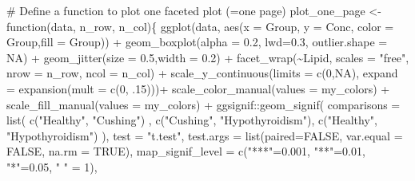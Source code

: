 \documentclass[
  letterpaper,
  DIV=11,
  numbers=noendperiod]{scrreprt}
\newenvironment{Shaded}{\begin{snugshade}}{\end{snugshade}}
\newcommand{\AttributeTok}[1]{\textcolor[rgb]{0.40,0.45,0.13}{#1}}
\newcommand{\CommentTok}[1]{\textcolor[rgb]{0.37,0.37,0.37}{#1}}
\newcommand{\ConstantTok}[1]{\textcolor[rgb]{0.56,0.35,0.01}{#1}}
\newcommand{\ControlFlowTok}[1]{\textcolor[rgb]{0.00,0.23,0.31}{#1}}
\newcommand{\DecValTok}[1]{\textcolor[rgb]{0.68,0.00,0.00}{#1}}
\newcommand{\FloatTok}[1]{\textcolor[rgb]{0.68,0.00,0.00}{#1}}
\newcommand{\FunctionTok}[1]{\textcolor[rgb]{0.28,0.35,0.67}{#1}}
\newcommand{\NormalTok}[1]{\textcolor[rgb]{0.00,0.23,0.31}{#1}}
\newcommand{\OtherTok}[1]{\textcolor[rgb]{0.00,0.23,0.31}{#1}}
\newcommand{\SpecialCharTok}[1]{\textcolor[rgb]{0.37,0.37,0.37}{#1}}
\newcommand{\StringTok}[1]{\textcolor[rgb]{0.13,0.47,0.30}{#1}}
\begin{document}
\begin{Shaded}
\begin{Highlighting}[]
\CommentTok{\# Define a function to plot one faceted plot (=one page)}
\NormalTok{plot\_one\_page }\OtherTok{\textless{}{-}} \ControlFlowTok{function}\NormalTok{(data, n\_row, n\_col)\{}
  \FunctionTok{ggplot}\NormalTok{(data, }\FunctionTok{aes}\NormalTok{(}\AttributeTok{x =}\NormalTok{ Group, }\AttributeTok{y =}\NormalTok{ Conc, }\AttributeTok{color =}\NormalTok{ Group,}\AttributeTok{fill =}\NormalTok{ Group)) }\SpecialCharTok{+} 
    \FunctionTok{geom\_boxplot}\NormalTok{(}\AttributeTok{alpha =} \FloatTok{0.2}\NormalTok{, }\AttributeTok{lwd=}\FloatTok{0.3}\NormalTok{, }\AttributeTok{outlier.shape =} \ConstantTok{NA}\NormalTok{) }\SpecialCharTok{+}
    \FunctionTok{geom\_jitter}\NormalTok{(}\AttributeTok{size =} \FloatTok{0.5}\NormalTok{,}\AttributeTok{width =} \FloatTok{0.2}\NormalTok{) }\SpecialCharTok{+}
    \FunctionTok{facet\_wrap}\NormalTok{(}\SpecialCharTok{\textasciitilde{}}\NormalTok{Lipid, }\AttributeTok{scales =} \StringTok{"free"}\NormalTok{, }\AttributeTok{nrow =}\NormalTok{ n\_row, }\AttributeTok{ncol =}\NormalTok{ n\_col) }\SpecialCharTok{+} 
    \FunctionTok{scale\_y\_continuous}\NormalTok{(}\AttributeTok{limits =} \FunctionTok{c}\NormalTok{(}\DecValTok{0}\NormalTok{,}\ConstantTok{NA}\NormalTok{), }\AttributeTok{expand =} \FunctionTok{expansion}\NormalTok{(}\AttributeTok{mult =} \FunctionTok{c}\NormalTok{(}\DecValTok{0}\NormalTok{, .}\DecValTok{15}\NormalTok{)))}\SpecialCharTok{+}
    \FunctionTok{scale\_color\_manual}\NormalTok{(}\AttributeTok{values =}\NormalTok{ my\_colors) }\SpecialCharTok{+}
    \FunctionTok{scale\_fill\_manual}\NormalTok{(}\AttributeTok{values =}\NormalTok{ my\_colors) }\SpecialCharTok{+}
\NormalTok{    ggsignif}\SpecialCharTok{::}\FunctionTok{geom\_signif}\NormalTok{(}
      \AttributeTok{comparisons =} \FunctionTok{list}\NormalTok{(}
        \FunctionTok{c}\NormalTok{(}\StringTok{"Healthy"}\NormalTok{, }\StringTok{"Cushing"}\NormalTok{) ,}
        \FunctionTok{c}\NormalTok{(}\StringTok{"Cushing"}\NormalTok{, }\StringTok{"Hypothyroidism"}\NormalTok{), }
        \FunctionTok{c}\NormalTok{(}\StringTok{"Healthy"}\NormalTok{, }\StringTok{"Hypothyroidism"}\NormalTok{)}
\NormalTok{      ), }
      \AttributeTok{test =} \StringTok{"t.test"}\NormalTok{, }
      \AttributeTok{test.args =} \FunctionTok{list}\NormalTok{(}\AttributeTok{paired=}\ConstantTok{FALSE}\NormalTok{, }\AttributeTok{var.equal =} \ConstantTok{FALSE}\NormalTok{, }\AttributeTok{na.rm =} \ConstantTok{TRUE}\NormalTok{), }
      \AttributeTok{map\_signif\_level =} \FunctionTok{c}\NormalTok{(}\StringTok{"***"}\OtherTok{=}\FloatTok{0.001}\NormalTok{, }\StringTok{"**"}\OtherTok{=}\FloatTok{0.01}\NormalTok{, }\StringTok{"*"}\OtherTok{=}\FloatTok{0.05}\NormalTok{, }\StringTok{" "} \OtherTok{=} \DecValTok{1}\NormalTok{),}

\end{Highlighting}
\end{Shaded}
\end{document}
